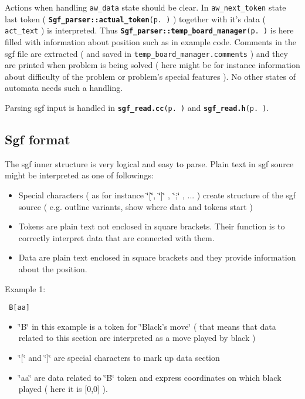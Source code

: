 Actions when handling {\tt aw\_\-data} state should be clear. In {\tt aw\_\-next\_\-token} state last token ( {\tt {\bf Sgf\_\-parser::actual\_\-token}{\rm (p.\,\pageref{classSgf__parser_r2})}} ) together with it's data ( {\tt act\_\-text} ) is interpreted. Thus {\tt {\bf Sgf\_\-parser::temp\_\-board\_\-manager}{\rm (p.\,\pageref{classSgf__parser_r12})}} is here filled with information about position such as in example code. Comments in the sgf file are extracted ( and saved in {\tt temp\_\-board\_\-manager.comments} ) and they are printed when problem is being solved ( here might be for instance information about difficulty of the problem or problem's special features ). No other states of automata needs such a handling.

Parsing sgf input is handled in {\tt {\bf sgf\_\-read.cc}{\rm (p.\,\pageref{sgf__read_8cc})}} and {\tt {\bf sgf\_\-read.h}{\rm (p.\,\pageref{sgf__read_8h})}}.\subsection{Sgf format}\label{page_5_page_5__sec_1}
The sgf inner structure is very logical and easy to parse. Plain text in sgf source might be interpreted as one of followings:\begin{itemize}
\item Special characters ( as for instance \char`\"{}[\char`\"{}, \char`\"{}]\char`\"{} , \char`\"{};\char`\"{} , ... ) create structure of the sgf source ( e.g. outline variants, show where data and tokens start )\item Tokens are plain text not enclosed in square brackets. Their function is to correctly interpret data that are connected with them.\item Data are plain text enclosed in square brackets and they provide information about the position.\end{itemize}


Example 1: 

\footnotesize\begin{verbatim} B[aa] 
\end{verbatim}
\normalsize
\begin{itemize}
\item \char`\"{}B\char`\"{} in this example is a token for \char`\"{}Black's move\char`\"{} ( that means that data related to this section are interpreted as a move played by black )\item \char`\"{}[\char`\"{} and \char`\"{}]\char`\"{} are special characters to mark up data section\item \char`\"{}aa\char`\"{} are data related to \char`\"{}B\char`\"{} token and express coordinates on which black played ( here it is [0,0] ).\end{itemize}


